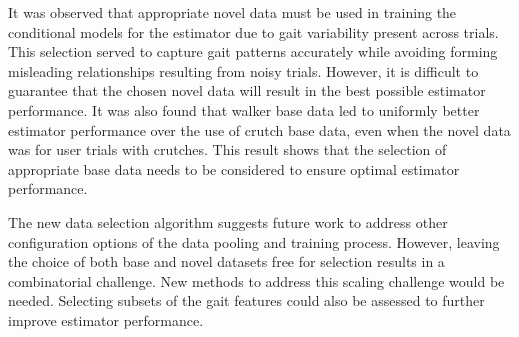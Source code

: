 It was observed that appropriate novel data must be used in training the conditional models for the estimator due to gait variability present across trials. This selection served to capture gait patterns accurately while avoiding forming misleading relationships resulting from noisy trials. However, it is difficult to guarantee that the chosen novel data will result in the best possible estimator performance. It was also found that walker base data led to uniformly better estimator performance over the use of crutch base data, even when the novel data was for user trials with crutches. This result shows that the selection of appropriate base data needs to be considered to ensure optimal estimator performance. 

The new data selection algorithm suggests future work to address other configuration options of the data pooling and training process. However, leaving the choice of both base and novel datasets free for selection results in a combinatorial challenge. New methods to address this scaling challenge would be needed. Selecting subsets of the gait features could also be assessed to further improve estimator performance.
